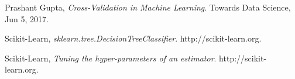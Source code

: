 \documentclass[12pt]{article}
\numberwithin{equation}{section}
\numberwithin{table}{section}
\numberwithin{figure}{section}
\begin{document}
\begin{thebibliography}{999}
	
	Prashant Gupta,
	\emph{Cross-Validation in Machine Learning}.
	Towards Data Science,
	Jun 5, 2017.
	
	Scikit-Learn,
	\emph{sklearn.tree.DecisionTreeClassifier}.
	http://scikit-learn.org.
	
	Scikit-Learn,
	\emph{Tuning the hyper-parameters of an estimator}.
	http://scikit-learn.org.
	
\end{thebibliography}
\end{document}
